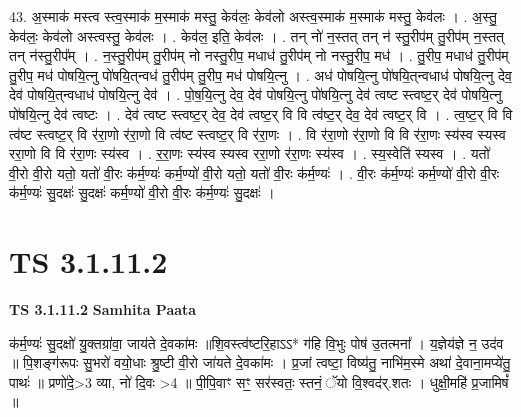 \documentclass[17pt]{extarticle}
\begin{document}
43. अ॒स्माक॑ मस्त्व स्त्व॒स्माक॑ म॒स्माक॑ मस्तु॒ केव॑लः॒ केव॑लो अस्त्व॒स्माक॑ म॒स्माक॑ मस्तु॒ केव॑लः । . अ॒स्तु॒ केव॑लः॒ केव॑लो अस्त्वस्तु॒ केव॑लः । . केव॑ल॒ इति॒ केव॑लः । . तन् नो॑ न॒स्तत् तन् न॑ स्तु॒रीप॑म् तु॒रीप॑म् न॒स्तत् तन् न॑स्तु॒रीप᳚म् । . न॒स्तु॒रीप॑म् तु॒रीप॑म् नो नस्तु॒रीप॒ मधाध॑ तु॒रीप॑म् नो नस्तु॒रीप॒ मध॑ । . तु॒रीप॒ मधाध॑ तु॒रीप॑म् तु॒रीप॒ मध॑ पोषयि॒त्नु पो॑षयि॒त्‌न्वध॑ तु॒रीप॑म् तु॒रीप॒ मध॑ पोषयि॒त्नु । . अध॑ पोषयि॒त्नु पो॑षयि॒त्‌न्वधाध॑ पोषयि॒त्नु देव॒ देव॑ पोषयि॒त्‌न्वधाध॑ पोषयि॒त्नु देव॑ । . पो॒ष॒यि॒त्नु देव॒ देव॑ पोषयि॒त्नु पो॑षयि॒त्नु देव॑ त्वष्ट स्त्वष्ट॒र् देव॑ पोषयि॒त्नु पो॑षयि॒त्नु देव॑ त्वष्टः । . देव॑ त्वष्ट स्त्वष्ट॒र् देव॒ देव॑ त्वष्ट॒र् वि वि त्व॑ष्ट॒र् देव॒ देव॑ त्वष्ट॒र् वि । . त्व॒ष्ट॒र् वि वि त्व॑ष्ट स्त्वष्ट॒र् वि र॑रा॒णो र॑रा॒णो वि त्व॑ष्ट स्त्वष्ट॒र् वि र॑रा॒णः । . वि र॑रा॒णो र॑रा॒णो वि वि र॑रा॒णः स्य॑स्व स्यस्व ररा॒णो वि वि र॑रा॒णः स्य॑स्व । . र॒रा॒णः स्य॑स्व स्यस्व ररा॒णो र॑रा॒णः स्य॑स्व । . स्य॒स्वेति॑ स्यस्व । . यतो॑ वी॒रो वी॒रो यतो॒ यतो॑ वी॒रः क॑र्म॒ण्यः॑ कर्म॒ण्यो॑ वी॒रो यतो॒ यतो॑ वी॒रः क॑र्म॒ण्यः॑ । . वी॒रः क॑र्म॒ण्यः॑ कर्म॒ण्यो॑ वी॒रो वी॒रः क॑र्म॒ण्यः॑ सु॒दक्षः॑ सु॒दक्षः॑ कर्म॒ण्यो॑ वी॒रो वी॒रः क॑र्म॒ण्यः॑ सु॒दक्षः॑ । \newline
\pagebreak
{}

\section{ TS 3.1.11.2 }

\textbf{TS 3.1.11.2 } \newline
\textbf{Samhita Paata} \newline

क॑र्म॒ण्यः॑ सु॒दक्षो॑ यु॒क्तग्रा॑वा॒ जाय॑ते दे॒वका॑मः ॥शि॒वस्त्व॑ष्टरि॒हाऽऽ* ग॑हि वि॒भुः पोष॑ उ॒तत्मना᳚ । य॒ज्ञेय॑ज्ञे न॒ उद॑व ॥ पि॒शङ्ग॑रूपः सु॒भरो॑ वयो॒धाः श्रु॒ष्टी वी॒रो जा॑यते दे॒वका॑मः । प्र॒जां त्वष्टा॒ विष्य॑तु॒ नाभि॑म॒स्मे अथा॑ दे॒वाना॒मप्ये॑तु॒ पाथः॑ ॥ प्रणो॑दे॒>3 व्या, नो॑ दि॒वः >4 ॥ पी॒पि॒वाꣳ सꣳ॒॒ सर॑स्वतः॒ स्तनं॒ ॅयो वि॒श्वद॑र्.शतः । धुक्षी॒महि॑ प्र॒जामिषं᳚ ॥ \newline
\end{document}
